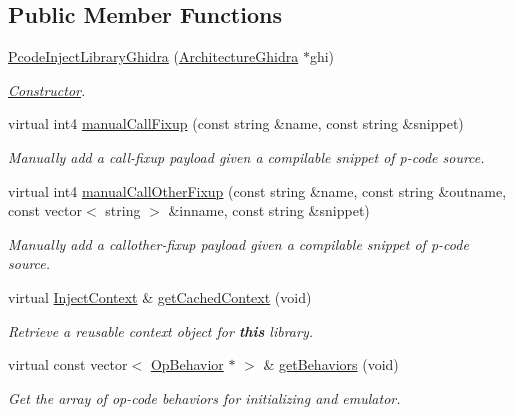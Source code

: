\subsection*{Public Member Functions}
\begin{DoxyCompactItemize}
\item 
\mbox{\hyperlink{class_pcode_inject_library_ghidra_a1a006d69d9331334be7a2e592b03cb73}{Pcode\+Inject\+Library\+Ghidra}} (\mbox{\hyperlink{class_architecture_ghidra}{Architecture\+Ghidra}} $\ast$ghi)
\begin{DoxyCompactList}\small\item\em \mbox{\hyperlink{class_constructor}{Constructor}}. \end{DoxyCompactList}\item 
virtual int4 \mbox{\hyperlink{class_pcode_inject_library_ghidra_a2e8265c935ddb94e4a2354706d823e14}{manual\+Call\+Fixup}} (const string \&name, const string \&snippet)
\begin{DoxyCompactList}\small\item\em Manually add a call-\/fixup payload given a compilable snippet of p-\/code {\itshape source}. \end{DoxyCompactList}\item 
virtual int4 \mbox{\hyperlink{class_pcode_inject_library_ghidra_a1c38e037571239e59daa21c08f2a2bbb}{manual\+Call\+Other\+Fixup}} (const string \&name, const string \&outname, const vector$<$ string $>$ \&inname, const string \&snippet)
\begin{DoxyCompactList}\small\item\em Manually add a callother-\/fixup payload given a compilable snippet of p-\/code {\itshape source}. \end{DoxyCompactList}\item 
virtual \mbox{\hyperlink{class_inject_context}{Inject\+Context}} \& \mbox{\hyperlink{class_pcode_inject_library_ghidra_a59bd920e9392308e571f2e18b30537a6}{get\+Cached\+Context}} (void)
\begin{DoxyCompactList}\small\item\em Retrieve a reusable context object for {\bfseries{this}} library. \end{DoxyCompactList}\item 
virtual const vector$<$ \mbox{\hyperlink{class_op_behavior}{Op\+Behavior}} $\ast$ $>$ \& \mbox{\hyperlink{class_pcode_inject_library_ghidra_a1195225ccb9918e6ca0b62d9a932b66f}{get\+Behaviors}} (void)
\begin{DoxyCompactList}\small\item\em Get the array of op-\/code behaviors for initializing and emulator. \end{DoxyCompactList}\end{DoxyCompactItemize}

